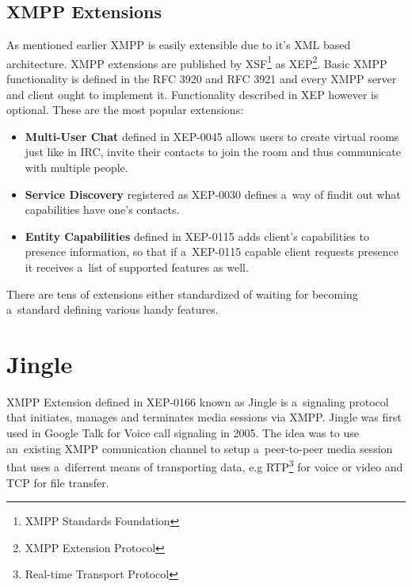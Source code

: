 \subsection*{XMPP Extensions}
As mentioned earlier XMPP is easily extensible due to it's XML based architecture. XMPP extensions are published by XSF\footnote{XMPP Standards Foundation} as XEP\footnote{XMPP Extension Protocol}. Basic XMPP functionality is defined in the RFC 3920 and RFC 3921 and every XMPP server and client ought to implement it. Functionality described in XEP however is optional. These are the most popular extensions:
\begin{itemize}
	\item{\bf Multi-User Chat} defined in XEP-0045 \cite{xepMUC} allows users to create virtual rooms just like in IRC, invite their contacts to join the room and thus communicate with multiple people.
	\item{\bf Service Discovery} registered as XEP-0030 \cite{xepServiceDiscovery} defines a~way of findit out what capabilities have one's contacts.
	\item{\bf Entity Capabilities} defined in XEP-0115 \cite{xepCapabilitiesAdvertisement} adds client's capabilities to presence information, so that if a~XEP-0115 capable client requests presence it receives a~list of supported features as well.
\end{itemize}

There are tens of extensions either standardized of waiting for becoming a~standard defining various handy features.

\section{Jingle}
XMPP Extension defined in XEP-0166 \cite{xepJignle} known as Jingle is a~signaling protocol that initiates, manages and terminates media sessions via XMPP. Jingle was first used in Google Talk \cite{googleTalk} for Voice call signaling in 2005. The idea was to use an~existing XMPP comunication channel to setup a~peer-to-peer media session that uses a~diferrent means of transporting data, e.g RTP\footnote{Real-time Transport Protocol} for voice or video and TCP for file transfer. 


